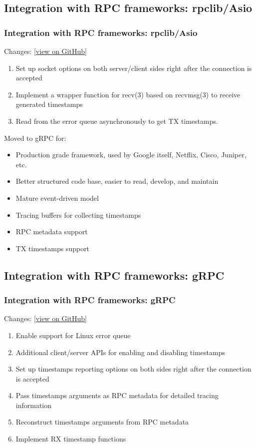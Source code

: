 \documentclass[10pt]{beamer}
\begin{document}
\subsection{Integration with RPC frameworks: rpclib/Asio}
\begin{frame}
\frametitle{Integration with RPC frameworks: rpclib/Asio}
    Changes:
\href{https://github.com/kyechou/rpclib/commit/568cc625ceaff7c3a9579db56b1d3cea513d7f55}{[view
    on GitHub]}
\begin{enumerate}
\item Set up socket options on both server/client sides right after the
      connection is accepted
\item Implement a wrapper function for recv(3) based on recvmsg(3) to receive
      generated timestamps
\item Read from the error queue asynchronously to get TX timestamps.
\end{enumerate}

Moved to gRPC for:
\begin{itemize}
\item Production grade framework, used by Google itself, Netflix, Cisco,
      Juniper, etc.
\item Better structured code base, easier to read, develop, and maintain
\item Mature event-driven model
\item Tracing buffers for collecting timestamps
\item RPC metadata support
\item TX timestamps support
\end{itemize}
\end{frame}

\subsection{Integration with RPC frameworks: gRPC}
\begin{frame}
\frametitle{Integration with RPC frameworks: gRPC}
    Changes:
\href{https://github.com/kyechou/grpc/commit/8fe57c107e0cff374ad4feba9a12231d877f5d31}{[view
    on GitHub]}
\begin{enumerate}
\item Enable support for Linux error queue
\item Additional client/server APIs for enabling and disabling timestamps
\item Set up timestamps reporting options on both sides right after the
      connection is accepted
\item Pass timestamps arguments as RPC metadata for detailed tracing information
\item Reconstruct timestamps arguments from RPC metadata
\item Implement RX timestamp functions
\end{enumerate}
\end{frame}
\end{document}
